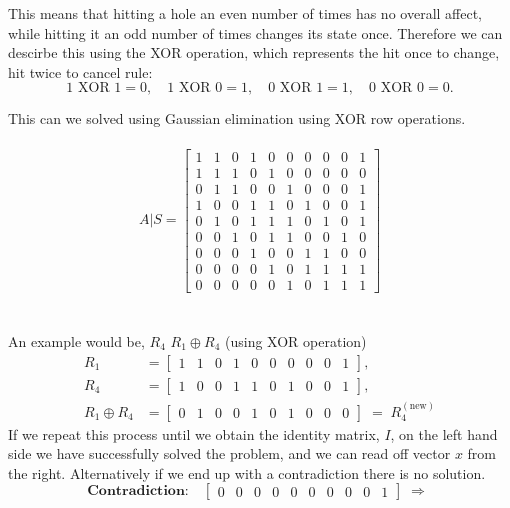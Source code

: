 \documentclass[11pt,a4paper]{article}
\begin{document}
This means that hitting a hole an even number of times has no overall affect, while hitting it an odd number of times changes its state once.
Therefore we can descirbe this using the XOR operation, which represents the hit once to change, hit twice to cancel rule:
\[
1 \text{ XOR } 1 = 0, \quad
1 \text{ XOR } 0 = 1, \quad
0 \text{ XOR } 1 = 1, \quad
0 \text{ XOR } 0 = 0.
\]

This can we solved using Gaussian elimination using XOR row operations.
\\\\
\[
A|S =
\left[
\begin{array}{ccccccccc|c}
1 & 1 & 0 & 1 & 0 & 0 & 0 & 0 & 0 & 1 \\
1 & 1 & 1 & 0 & 1 & 0 & 0 & 0 & 0 & 0 \\
0 & 1 & 1 & 0 & 0 & 1 & 0 & 0 & 0 & 1 \\
1 & 0 & 0 & 1 & 1 & 0 & 1 & 0 & 0 & 1 \\
0 & 1 & 0 & 1 & 1 & 1 & 0 & 1 & 0 & 1 \\
0 & 0 & 1 & 0 & 1 & 1 & 0 & 0 & 1 & 0 \\
0 & 0 & 0 & 1 & 0 & 0 & 1 & 1 & 0 & 0 \\
0 & 0 & 0 & 0 & 1 & 0 & 1 & 1 & 1 & 1 \\
0 & 0 & 0 & 0 & 0 & 1 & 0 & 1 & 1 & 1
\end{array}
\right]
\]
\\\\
An example would be, $R_4$ \leftarrow $R_1 \oplus R_4$ (using XOR operation)
\[
\begin{aligned}
R_1 &=
\left[\begin{array}{ccccccccc|c}
1 & 1 & 0 & 1 & 0 & 0 & 0 & 0 & 0 & 1
\end{array}\right],\\[4pt]
R_4 &=
\left[\begin{array}{ccccccccc|c}
1 & 0 & 0 & 1 & 1 & 0 & 1 & 0 & 0 & 1
\end{array}\right],\\[4pt]
R_1 \oplus R_4 &=
\left[\begin{array}{ccccccccc|c}
0 & 1 & 0 & 0 & 1 & 0 & 1 & 0 & 0 & 0
\end{array}\right] \;=\; R_4^{(\text{new})}
\end{aligned}
\]
If we repeat this process until we obtain the identity matrix, $I$, on the left hand side we have successfully solved the problem, and we can read off vector $x$ from the right. Alternatively if we end up with a contradiction there is no solution.
\[
\textbf{Contradiction:}\quad
\left[\begin{array}{ccccccccc|c}
0 & 0 & 0 & 0 & 0 & 0 & 0 & 0 & 0 & 1
\end{array}\right]
\;\Rightarrow\;
\]
\end{document}
